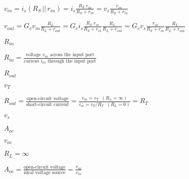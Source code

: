 \documentclass{article}
\def\lthtmlcheckvsize{\ifdim\ht\sizebox<\vsize 
  \ifdim\wd\sizebox<\hsize\expandafter\hfill\fi \expandafter\vfill
  \else\expandafter\vss\fi}%
\begin{document}
{\newpage\clearpage
{}%
$\displaystyle v_{in}=i_s (R_S \,||\, r_{in})=i_s \frac{R_S\; r_{in}}{R_S+r_{in}}
=v_s \frac{r_{in}}{R_S+r_{in}}$%
\lthtmlindisplaymathZ
\lthtmlcheckvsize\clearpage}

{\newpage\clearpage
{}%
$\displaystyle v_{out}=G_v v_{in} \frac{R_L}{R_L+r_{out}}
=G_v i_s \frac{R_S \;r_{in}}{R_S+r_{in}} \frac{R_L}{R_L+r_{out}}
=G_v v_s \frac{r_{in}}{R_S+r_{in}} \frac{R_L}{R_L+r_{out}}$%
\lthtmlindisplaymathZ
\lthtmlcheckvsize\clearpage}

{\newpage\clearpage
{}%
$ R_{in}$%
\lthtmlindisplaymathZ
\lthtmlcheckvsize\clearpage}

{\newpage\clearpage
{}%
$\displaystyle R_{in}=\frac{\mbox{voltage $v_{in}$\  across the input port}}
{\mbox{current $i_{in}$\  through the input port}}$%
\lthtmlindisplaymathZ
\lthtmlcheckvsize\clearpage}

{\newpage\clearpage
{}%
$ R_{out}$%
\lthtmlindisplaymathZ
\lthtmlcheckvsize\clearpage}

{\newpage\clearpage
{}%
$ v_T$%
\lthtmlindisplaymathZ
\lthtmlcheckvsize\clearpage}

{\newpage\clearpage
{}%
$\displaystyle R_{out}=\frac{\mbox{open-circuit voltage}}{\mbox{short-circuit current}}
=\frac{v_{oc}=v_T\;\;(R_L=\infty)}{i_{sc}=v_T/R_T\;\;(R_L=0)}=R_T$%
\lthtmlindisplaymathZ
\lthtmlcheckvsize\clearpage}

{\newpage\clearpage
{}%
$ v_s$%
\lthtmlindisplaymathZ
\lthtmlcheckvsize\clearpage}

{\newpage\clearpage
{}%
$ A_{oc}$%
\lthtmlindisplaymathZ
\lthtmlcheckvsize\clearpage}

{\newpage\clearpage
{}%
$ v_{oc}$%
\lthtmlindisplaymathZ
\lthtmlcheckvsize\clearpage}

{\newpage\clearpage
{}%
$ R_L=\infty$%
\lthtmlindisplaymathZ
\lthtmlcheckvsize\clearpage}

{\newpage\clearpage
{}%
$\displaystyle A_{oc}=\frac{\mbox{open-circuit voltage}}{\mbox{ideal voltage source}}
=\frac{v_{oc}}{v_{in}}$%
\lthtmlindisplaymathZ
\lthtmlcheckvsize\clearpage}
\end{document}
